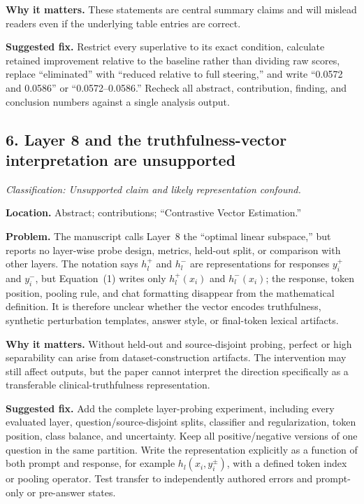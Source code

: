 \documentclass[11pt]{article}
\newcommand{\findinglabel}[1]{\textbf{#1}}
\newcommand{\classification}[1]{\textit{Classification: #1.}}
\begin{document}
\findinglabel{Why it matters.} These statements are central summary claims and will mislead readers even if the underlying table entries are correct.

\findinglabel{Suggested fix.} Restrict every superlative to its exact condition, calculate retained improvement relative to the baseline rather than dividing raw scores, replace ``eliminated'' with ``reduced relative to full steering,'' and write ``0.0572 and 0.0586'' or ``0.0572--0.0586.''  Recheck all abstract, contribution, finding, and conclusion numbers against a single analysis output.

\subsection*{6. Layer 8 and the truthfulness-vector interpretation are unsupported}

\classification{Unsupported claim and likely representation confound}

\findinglabel{Location.} Abstract; contributions; ``Contrastive Vector Estimation.''

\findinglabel{Problem.} The manuscript calls Layer~8 the ``optimal linear subspace,'' but reports no layer-wise probe design, metrics, held-out split, or comparison with other layers.  The notation says $h_l^+$ and $h_l^-$ are representations for responses $y_i^+$ and $y_i^-$, but Equation~(1) writes only $h_l^+(x_i)$ and $h_l^-(x_i)$; the response, token position, pooling rule, and chat formatting disappear from the mathematical definition.  It is therefore unclear whether the vector encodes truthfulness, synthetic perturbation templates, answer style, or final-token lexical artifacts.

\findinglabel{Why it matters.} Without held-out and source-disjoint probing, perfect or high separability can arise from dataset-construction artifacts.  The intervention may still affect outputs, but the paper cannot interpret the direction specifically as a transferable clinical-truthfulness representation.

\findinglabel{Suggested fix.} Add the complete layer-probing experiment, including every evaluated layer, question/source-disjoint splits, classifier and regularization, token position, class balance, and uncertainty.  Keep all positive/negative versions of one question in the same partition.  Write the representation explicitly as a function of both prompt and response, for example $h_l(x_i,y_i^{\pm})$, with a defined token index or pooling operator.  Test transfer to independently authored errors and prompt-only or pre-answer states.
\end{document}
